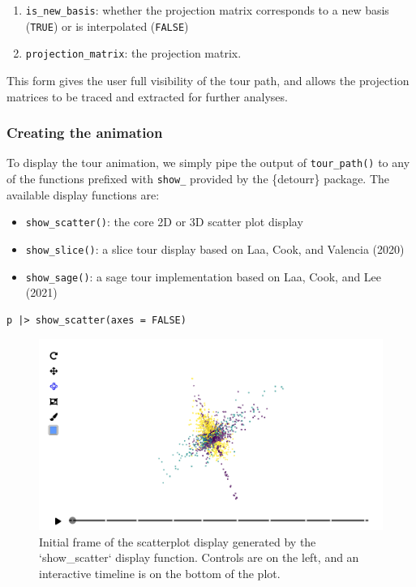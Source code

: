 \begin{enumerate}
\def\labelenumi{\arabic{enumi}.}
\tightlist
\item
  \texttt{is\_new\_basis}: whether the projection matrix corresponds to a new basis (\texttt{TRUE}) or is interpolated (\texttt{FALSE})
\item
  \texttt{projection\_matrix}: the projection matrix.
\end{enumerate}

This form gives the user full visibility of the tour path, and allows the projection matrices to be traced and extracted for further analyses.

\hypertarget{creating-the-animation}{%
\subsubsection{Creating the animation}\label{creating-the-animation}}

To display the tour animation, we simply pipe the output of \texttt{tour\_path()} to any of the functions prefixed with \texttt{show\_} provided by the \{detourr\} package. The available display functions are:

\begin{itemize}
\tightlist
\item
  \texttt{show\_scatter()}: the core 2D or 3D scatter plot display
\item
  \texttt{show\_slice()}: a slice tour display based on Laa, Cook, and Valencia (2020)
\item
  \texttt{show\_sage()}: a sage tour implementation based on Laa, Cook, and Lee (2021)
\end{itemize}

\begin{verbatim}
p |> show_scatter(axes = FALSE)
\end{verbatim}

\begin{figure}
\includegraphics[width=\textwidth]{figures/implementation/pdfsense_scatter_3d} \caption{Initial frame of the scatterplot display generated by the `show\_scatter` display function. Controls are on the left, and an interactive timeline is on the bottom of the plot.}\label{fig:scatter-display-static}
\end{figure}

